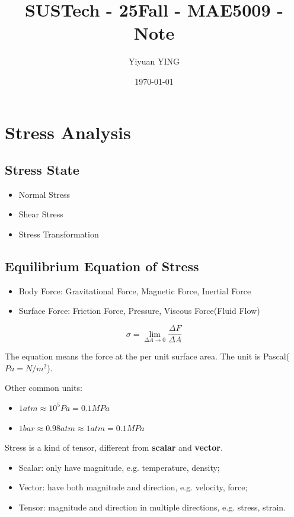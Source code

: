 \documentclass[en,hazy,cyan,8pt,normal]{elegantnote}
\title{SUSTech - 25Fall - MAE5009 - Note}
\author{Yiyuan YING}
\institute{Southern University of Science and Technology}
\date{\today}
\numberwithin{equation}{section}
\begin{document}
\maketitle

\section{Stress Analysis}
  \subsection{Stress State}
    \begin{itemize}
      \item Normal Stress
      \item Shear Stress
      \item Stress Transformation
    \end{itemize}

  \subsection{Equilibrium Equation of Stress}
    \begin{itemize}
      \item Body Force: Gravitational Force, Magnetic Force, Inertial Force
      \item Surface Force: Friction Force, Pressure, Viscous Force(Fluid Flow)
    \end{itemize}

    \begin{equation}\label{eq:001}
      \sigma=\lim_{\Delta A \to 0} \frac{\Delta F}{\Delta A}
    \end{equation}

    The equation means the force at the per unit surface area. The unit is Pascal($Pa=N/m^2$).

    Other common units:
    \begin{itemize}
      \item $1 atm \approx 10^5 Pa = 0.1 MPa$
      \item $1 bar \approx 0.98 atm \approx 1 atm = 0.1 MPa$
    \end{itemize}

    Stress is a kind of tensor, different from \textbf{scalar} and \textbf{vector}.
    \begin{itemize}
      \item Scalar: only have magnitude, e.g. temperature, density;
      \item Vector: have both magnitude and direction, e.g. velocity, force;
      \item Tensor: magnitude and direction in multiple directions, e.g. stress, strain.
    \end{itemize}
\end{document}
